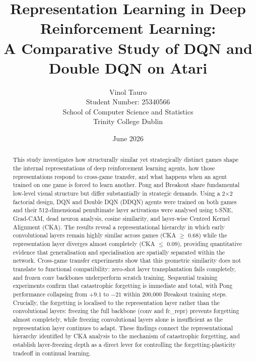 \documentclass[a4paper]{article}
\begin{document}
\title{\textbf{Representation Learning in Deep Reinforcement Learning:}\\
       \large A Comparative Study of DQN and Double DQN on Atari}
\author{Vinol Tauro\\
        \small Student Number: 25340566\\
        \small School of Computer Science and Statistics\\
        \small Trinity College Dublin}
\date{June 2026}
\maketitle

\begin{abstract}
This study investigates how structurally similar yet strategically distinct games shape the internal representations of deep reinforcement learning agents, how those representations respond to cross-game transfer, and what happens when an agent trained on one game is forced to learn another. Pong and Breakout share fundamental low-level visual structure but differ substantially in strategic demands. Using a 2$\times$2 factorial design, DQN and Double DQN (DDQN) agents were trained on both games and their 512-dimensional penultimate layer activations were analysed using t-SNE, Grad-CAM, dead neuron analysis, cosine similarity, and layer-wise Centred Kernel Alignment (CKA). The results reveal a representational hierarchy in which early convolutional layers remain highly similar across games (CKA $\geq$ 0.68) while the representation layer diverges almost completely (CKA $\leq$ 0.09), providing quantitative evidence that generalisation and specialisation are spatially separated within the network. Cross-game transfer experiments show that this geometric similarity does not translate to functional compatibility: zero-shot layer transplantation fails completely, and frozen conv backbones underperform scratch training. Sequential training experiments confirm that catastrophic forgetting is immediate and total, with Pong performance collapsing from $+9.1$ to $-21$ within 200,000 Breakout training steps. Crucially, the forgetting is localised to the representation layer rather than the convolutional layers: freezing the full backbone (conv and fc\_repr) prevents forgetting almost completely, while freezing convolutional layers alone is insufficient as the representation layer continues to adapt. These findings connect the representational hierarchy identified by CKA analysis to the mechanism of catastrophic forgetting, and establish layer-freezing depth as a direct lever for controlling the forgetting-plasticity tradeoff in continual learning.
\end{abstract}
\end{document}
